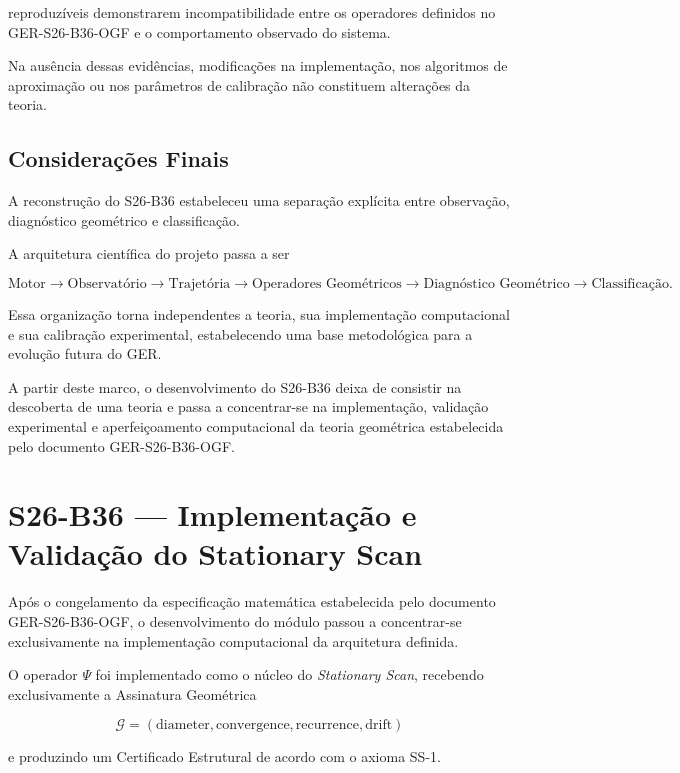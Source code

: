 \documentclass[11pt,a4paper]{article}
\begin{document}
reproduzíveis demonstrarem incompatibilidade entre os operadores definidos no
GER-S26-B36-OGF e o comportamento observado do sistema.

Na ausência dessas evidências, modificações na implementação, nos algoritmos de
aproximação ou nos parâmetros de calibração não constituem alterações da teoria.

\subsection{Considerações Finais}

A reconstrução do S26-B36 estabeleceu uma separação explícita entre observação,
diagnóstico geométrico e classificação.

A arquitetura científica do projeto passa a ser

\[
\text{Motor}
\longrightarrow
\text{Observatório}
\longrightarrow
\text{Trajetória}
\longrightarrow
\text{Operadores Geométricos}
\longrightarrow
\text{Diagnóstico Geométrico}
\longrightarrow
\text{Classificação}.
\]

Essa organização torna independentes a teoria, sua implementação computacional e sua
calibração experimental, estabelecendo uma base metodológica para a evolução futura do
GER.

A partir deste marco, o desenvolvimento do S26-B36 deixa de consistir na descoberta de
uma teoria e passa a concentrar-se na implementação, validação experimental e
aperfeiçoamento computacional da teoria geométrica estabelecida pelo documento
GER-S26-B36-OGF.

\section{S26-B36 --- Implementação e Validação do Stationary Scan}

Após o congelamento da especificação matemática estabelecida pelo documento
GER-S26-B36-OGF, o desenvolvimento do módulo passou a concentrar-se
exclusivamente na implementação computacional da arquitetura definida.

O operador $\Psi$ foi implementado como o núcleo do \textit{Stationary Scan},
recebendo exclusivamente a Assinatura Geométrica

\[
\mathcal{G}
=
(\mathrm{diameter},
\mathrm{convergence},
\mathrm{recurrence},
\mathrm{drift})
\]

e produzindo um Certificado Estrutural de acordo com o axioma SS-1.
\end{document}
